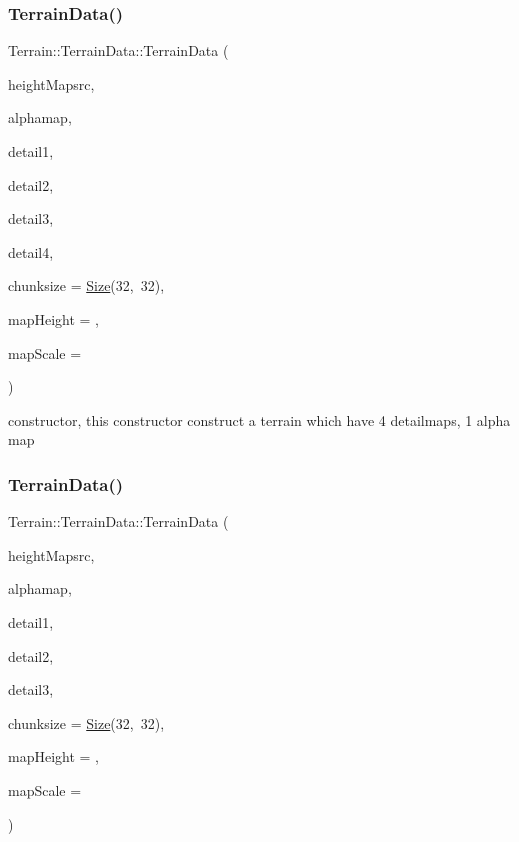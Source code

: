 \subsubsection{\texorpdfstring{Terrain\+Data()}{TerrainData()}\hspace{0.1cm}{\footnotesize\ttfamily [7/8]}}
{\footnotesize\ttfamily Terrain\+::\+Terrain\+Data\+::\+Terrain\+Data (\begin{DoxyParamCaption}\item[{const std\+::string \&}]{height\+Mapsrc,  }\item[{const std\+::string \&}]{alphamap,  }\item[{const \hyperlink{structTerrain_1_1DetailMap}{Detail\+Map} \&}]{detail1,  }\item[{const \hyperlink{structTerrain_1_1DetailMap}{Detail\+Map} \&}]{detail2,  }\item[{const \hyperlink{structTerrain_1_1DetailMap}{Detail\+Map} \&}]{detail3,  }\item[{const \hyperlink{structTerrain_1_1DetailMap}{Detail\+Map} \&}]{detail4,  }\item[{const \hyperlink{classSize}{Size} \&}]{chunksize = {\ttfamily \hyperlink{classSize}{Size}(32,~32)},  }\item[{float}]{map\+Height = {},  }\item[{float}]{map\+Scale = {} }\end{DoxyParamCaption})}

constructor, this constructor construct a terrain which have 4 detailmaps, 1 alpha map \mbox{\label{structTerrain_1_1TerrainData_ae57aa479b584a59c7dcd44266b91a024}} 
\subsubsection{\texorpdfstring{Terrain\+Data()}{TerrainData()}\hspace{0.1cm}{\footnotesize\ttfamily [8/8]}}
{\footnotesize\ttfamily Terrain\+::\+Terrain\+Data\+::\+Terrain\+Data (\begin{DoxyParamCaption}\item[{const std\+::string \&}]{height\+Mapsrc,  }\item[{const std\+::string \&}]{alphamap,  }\item[{const \hyperlink{structTerrain_1_1DetailMap}{Detail\+Map} \&}]{detail1,  }\item[{const \hyperlink{structTerrain_1_1DetailMap}{Detail\+Map} \&}]{detail2,  }\item[{const \hyperlink{structTerrain_1_1DetailMap}{Detail\+Map} \&}]{detail3,  }\item[{const \hyperlink{classSize}{Size} \&}]{chunksize = {\ttfamily \hyperlink{classSize}{Size}(32,~32)},  }\item[{float}]{map\+Height = {},  }\item[{float}]{map\+Scale = {} }\end{DoxyParamCaption})}

